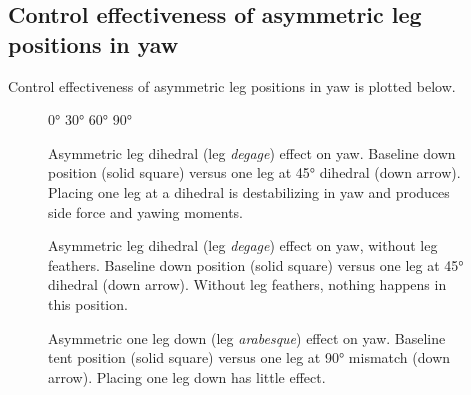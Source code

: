 \subsection{Control effectiveness of asymmetric leg positions in yaw}
Control effectiveness of asymmetric leg positions in yaw is plotted below.
\begin{figure}
\ang{0} %
\ang{30} %
\ang{60} %
\ang{90} %
\caption{Asymmetric leg dihedral (leg \emph{degage}) effect on yaw.  Baseline down position (solid square) versus one leg at \ang{45} dihedral (down arrow).  Placing one leg at a dihedral is destabilizing in yaw and produces side force and yawing moments.}
\end{figure}
\begin{figure}
\caption{Asymmetric leg dihedral (leg \emph{degage}) effect on yaw, without leg feathers.  Baseline down position (solid square) versus one leg at \ang{45} dihedral (down arrow).  Without leg feathers, nothing happens in this position.}
\end{figure}
\begin{figure}
\caption{Asymmetric one leg down (leg \emph{arabesque}) effect on yaw.  Baseline tent position (solid square) versus one leg at \ang{90} mismatch (down arrow).  Placing one leg down has little effect.}
\end{figure}
